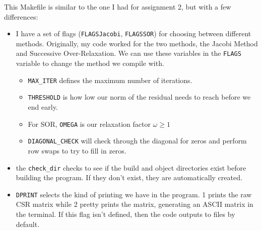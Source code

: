 \documentclass[12pt]{article}
\begin{document}
    This Makefile is similar to the one I had for assignment 2, but with a few differences:
    \begin{itemize}
        \item I have a set of flags (\verb|FLAGSJacobi|, \verb|FLAGSSOR|) for choosing between different methods. Originally, my code worked for the two methods, the Jacobi Method and Successive Over-Relaxation. We can use these variables in the \verb|FLAGS| variable to change the method we compile with.
        \begin{itemize}
            \item \verb|MAX_ITER| defines the maximum number of iterations.
            \item \verb|THRESHOLD| is how low our norm of the residual needs to reach before we end early.
            \item For SOR, \verb|OMEGA| is our relaxation factor $\omega \geq 1$
            \item \verb|DIAGONAL_CHECK| will check through the diagonal for zeros and perform row swaps to try to fill in zeros.
        \end{itemize}

        
        \item the \verb|check_dir| checks to see if the build and object directories exist before building the program. If they don't exist, they are automatically created.
        \item \verb|DPRINT| selects the kind of printing we have in the program. 1 prints the raw CSR matrix while 2 pretty prints the matrix, generating an ASCII matrix in the terminal. If this flag isn't defined, then the code outputs to files by default.
    \end{itemize}
\end{document}
